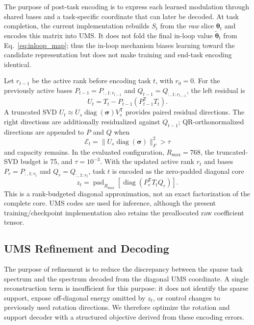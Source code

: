 The purpose of post-task encoding is to express each learned modulation through
shared bases and a task-specific coordinate that can later be decoded.  At task
completion, the current implementation rebuilds $S_t$ from the
\emph{raw} slice $\boldsymbol{\theta}_t$ and encodes this matrix into UMS.  It
does not fold the final in-loop value
$\widetilde{\boldsymbol{\theta}}_t$ from Eq.~\eqref{eq:inloop_map}; thus the
in-loop mechanism biases learning toward the candidate representation but does
not make training and end-task encoding identical.

Let $r_{t-1}$ be the active rank before encoding task $t$, with $r_0=0$.
For the previously active bases $P_{t-1}=P_{:,1:r_{t-1}}$ and
$Q_{t-1}=Q_{:,1:r_{t-1}}$, the left residual is
\begin{equation}
 U_t=T_t-P_{t-1}(P_{t-1}^{\mathsf T}T_t).
 \label{eq:left_residual}
\end{equation}
A truncated SVD
$U_t\approx U_s\operatorname{diag}(\boldsymbol{\sigma})V_s^{\mathsf T}$
provides paired residual directions.  The right directions are additionally
residualized against $Q_{t-1}$; QR-orthonormalized directions are appended to $P$
and $Q$ when
\begin{equation}
 \mathcal{E}_t=\|U_s\operatorname{diag}(\boldsymbol{\sigma})\|_F^2>\tau
 \label{eq:residual_energy}
\end{equation}
and capacity remains.  In the evaluated configuration,
$R_{\max}=768$, the truncated-SVD budget is 75, and $\tau=10^{-3}$.  With the
updated active rank $r_t$ and bases $P_r=P_{:,1:r_t}$ and
$Q_r=Q_{:,1:r_t}$, task $t$ is encoded as the zero-padded diagonal core
\begin{equation}
 z_t=\operatorname{pad}_{R_{\max}}\!\left[
 \operatorname{diag}\!\left(P_r^{\mathsf T}T_tQ_r\right)\right].
 \label{eq:task_code}
\end{equation}
This is a rank-budgeted diagonal approximation, not an exact factorization of
the complete core.  UMS codes are used for inference, although the present
training/checkpoint implementation also retains the preallocated raw
coefficient tensor.

\subsection{UMS Refinement and Decoding}
\label{sec:multiobjective}

The purpose of refinement is to reduce the discrepancy between the sparse task
spectrum and the spectrum decoded from the diagonal UMS coordinate.  A single
reconstruction term is insufficient for this purpose: it does not identify the
sparse support, expose off-diagonal energy omitted by $z_t$, or control changes
to previously used rotation directions.  We therefore optimize the rotation
and support decoder with a structured objective derived from these encoding
errors.

